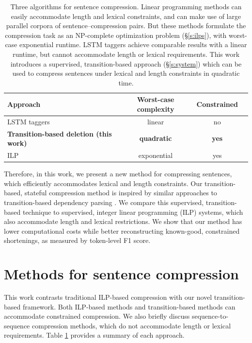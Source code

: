\documentclass[11pt,a4paper]{article}
\begin{document}
\begin{table}[htb!]
\begin{tabular}{lccc}
\textbf{Approach} & \textbf{Worst-case complexity} & \textbf{Constrained}  \\ \hline
LSTM taggers \cite{filippova2015sentence}   & linear              & no         \\   
\textbf{Transition-based deletion (this work)}  & \textbf{quadratic}     &      \textbf{yes}   \\
ILP    \cite{filippova2013overcoming,Wang2017CanSH}       &   exponential    & yes      \\
\end{tabular}
\caption{Three algorithms for sentence compression. Linear programming methods \cite{clarke2008global,filippova2013overcoming,Wang2017CanSH} can easily accommodate length and lexical constraints, and can make use of large parallel corpora of sentence--compression pairs. But these methods formulate the compression task as an NP-complete optimization problem (\S\ref{s:ilps}), with worst-case exponential runtime. LSTM taggers \cite{filippova2015sentence} achieve comparable results with a linear runtime, but cannot accommodate length or lexical requirements. This work introduces a supervised, transition-based approach (\S\ref{s:system}) which can be used to compress sentences under lexical and length constraints in quadratic time.} 
\label{t:algos}
\end{table}


Therefore, in this work, we present a new method for compressing sentences, which efficiently accommodates lexical and length constraints. Our transition-based, stateful compression method is inspired by similar approaches to transition-based dependency parsing \cite{nivre2003,D14-1082}. We compare this supervised, transition-based technique to supervised, integer linear programming (ILP) systems, which also accommodate length and lexical restrictions. We show that our method has lower computational costs while better reconstructing known-good, constrained shortenings, as measured by token-level F1 score. 

\section{Methods for sentence compression}

This work contrasts traditional ILP-based compression with our novel transition-based framework. Both ILP-based methods and transition-based methods can accommodate constrained compression. We also briefly discuss sequence-to-sequence compression methods, which do not accommodate length or lexical requirements. Table \ref{t:algos} provides a summary of each approach.
\end{document}

